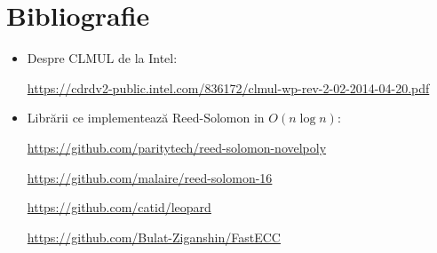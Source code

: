 \documentclass{beamer}
\begin{document}
\section{Bibliografie}
\begin{frame}
\begin{tiny}
\begin{itemize}
\item
Despre CLMUL de la Intel:

\url{https://cdrdv2-public.intel.com/836172/clmul-wp-rev-2-02-2014-04-20.pdf}

\item
Librării ce implementează Reed-Solomon in $O(n \log n)$:

\url{https://github.com/paritytech/reed-solomon-novelpoly}

\url{https://github.com/malaire/reed-solomon-16}

\url{https://github.com/catid/leopard}

\url{https://github.com/Bulat-Ziganshin/FastECC}

\end{itemize}
\end{tiny}
\end{frame}
\end{document}
